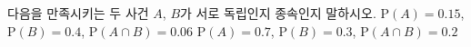다음을 만족시키는 두 사건 $A$, $B$가 서로 독립인지 종속인지 말하시오.
 $\mathrm{P}(A)=0.15$, $\mathrm{P}(B)=0.4$, $\mathrm{P}(A\cap B)=0.06$
 $\mathrm{P}(A)=0.7$, $\mathrm{P}(B)=0.3$, $\mathrm{P}(A\cap B)=0.2$
